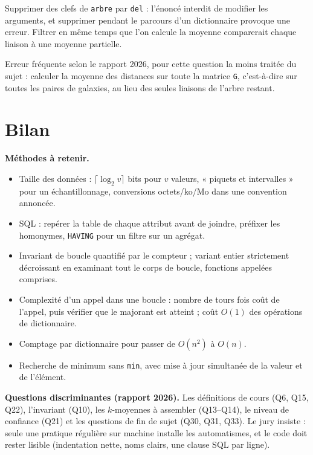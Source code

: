 \documentclass[11pt,a4paper]{article}
\providecommand{\tightlist}{\setlength{\itemsep}{0pt}\setlength{\parskip}{0pt}}
\begin{document}
\begin{piege}

Supprimer des clefs de \texttt{arbre} par \texttt{del} : l'énoncé interdit de modifier les arguments, et supprimer pendant le parcours d'un dictionnaire provoque une erreur. Filtrer en même temps que l'on calcule la moyenne comparerait chaque liaison à une moyenne partielle.

\end{piege}

\begin{piege}

Erreur fréquente selon le rapport 2026, pour cette question la moins traitée du sujet : calculer la moyenne des distances sur toute la matrice \texttt{G}, c'est-à-dire sur toutes les paires de galaxies, au lieu des seules liaisons de l'arbre restant.

\end{piege}

\hypertarget{bilan}{%
\section{Bilan}\label{bilan}}

\textbf{Méthodes à retenir.}

\begin{itemize}
\tightlist
\item
  Taille des données : \(\lceil \log_2 v \rceil\) bits pour \(v\) valeurs, « piquets et intervalles » pour un échantillonnage, conversions octets/ko/Mo dans une convention annoncée.
\item
  SQL : repérer la table de chaque attribut avant de joindre, préfixer les homonymes, \texttt{HAVING} pour un filtre sur un agrégat.
\item
  Invariant de boucle quantifié par le compteur ; variant entier strictement décroissant en examinant tout le corps de boucle, fonctions appelées comprises.
\item
  Complexité d'un appel dans une boucle : nombre de tours fois coût de l'appel, puis vérifier que le majorant est atteint ; coût \(O(1)\) des opérations de dictionnaire.
\item
  Comptage par dictionnaire pour passer de \(O(n^2)\) à \(O(n)\).
\item
  Recherche de minimum sans \texttt{min}, avec mise à jour simultanée de la valeur et de l'élément.
\end{itemize}

\textbf{Questions discriminantes (rapport 2026).} Les définitions de cours (Q6, Q15, Q22), l'invariant (Q10), les \(k\)-moyennes à assembler (Q13--Q14), le niveau de confiance (Q21) et les questions de fin de sujet (Q30, Q31, Q33). Le jury insiste : seule une pratique régulière sur machine installe les automatismes, et le code doit rester lisible (indentation nette, noms clairs, une clause SQL par ligne).
\end{document}
